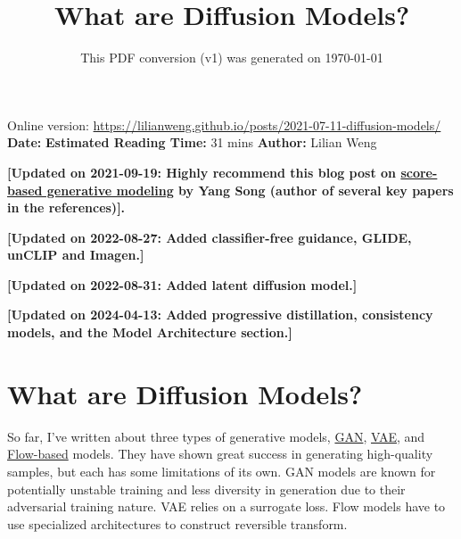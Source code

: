 \documentclass[12pt]{article}
\title{What are Diffusion Models?}
\date{This PDF conversion (v1) was generated on \today\footnotemark}
\begin{document}
\maketitle
\begin{center}
    Online version: \url{https://lilianweng.github.io/posts/2021-07-11-diffusion-models/} \\
    \textbf{Date:} \quad
    \textbf{Estimated Reading Time:}  31 mins \quad
    \textbf{Author:} Lilian Weng
\end{center}

\textbf{[Updated on 2021-09-19: Highly recommend this blog post on \href{https://yang-song.github.io/blog/2021/score/}{score-based generative modeling} by Yang Song (author of several key papers in the references)].}

\textbf{[Updated on 2022-08-27: Added classifier-free guidance, GLIDE, unCLIP and Imagen.]}

\textbf{[Updated on 2022-08-31: Added latent diffusion model.]}

\textbf{[Updated on 2024-04-13: Added progressive distillation, consistency models, and the Model Architecture section.]}


\newpage
\tableofcontents
\newpage
\vspace{1em}

\section{What are Diffusion Models?}



So far, I’ve written about three types of generative models, \href{https://lilianweng.github.io/posts/2017-08-20-gan/}{GAN}, \href{https://lilianweng.github.io/posts/2018-08-12-vae/}{VAE}, and \href{https://lilianweng.github.io/posts/2018-10-13-flow-models/}{Flow-based} models. They have shown great success in generating high-quality samples, but each has some limitations of its own. GAN models are known for potentially unstable training and less diversity in generation due to their adversarial training nature. VAE relies on a surrogate loss. Flow models have to use specialized architectures to construct reversible transform.
\end{document}

